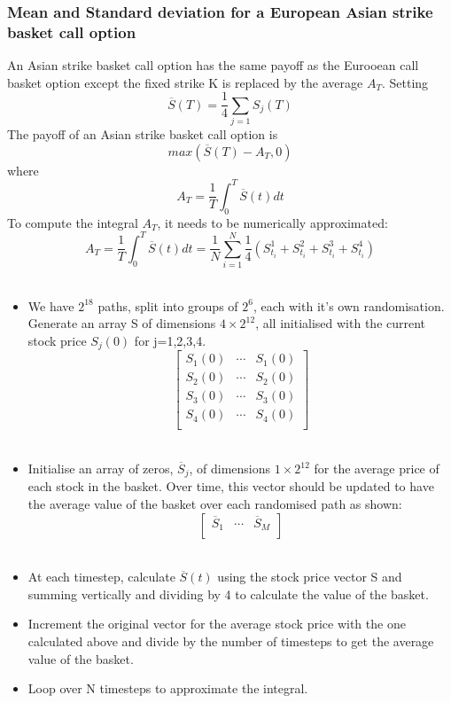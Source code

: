 \documentclass{article}
\begin{document}
\subsubsection* {Mean and Standard deviation for a European Asian strike basket call option}
An Asian strike basket call option has the same payoff as the Eurooean call basket option except the fixed strike K is replaced by the average $A_T$. 
Setting \[\overline{S}(T) = \frac{1}{4}\sum_{j=1} S_j(T)\]
The payoff of an Asian strike basket call option is  \[max(\overline{S}(T)  - A_T, 0)\]
where \[A_T = \frac{1}{T} \int_{0}^{T} \overline{S}(t) dt\]
To compute the integral $A_T$, it needs to be numerically approximated:
 \[A_T = \frac{1}{T} \int_{0}^{T} \overline{S}(t) dt = \frac{1}{N} \sum_{i=1}^{N}\frac{1}{4}(S_{t_i}^1 +S_{t_i}^2+ S_{t_i}^3+S_{t_i}^4)\]\
\begin{itemize}
\item We have $2^{18}$ paths, split into groups of $2^6$, each with it's own randomisation. Generate an array S of dimensions $4 \times 2^{12} $, all initialised with the current stock price $S_j(0)$ for j=1,2,3,4.
\[
\begin{bmatrix}
S_1(0) & \cdots & S_1(0)\\
S_2(0) & \cdots & S_2(0)\\
S_3(0) & \cdots & S_3(0)\\
S_4(0) & \cdots & S_4(0)\\
\end{bmatrix}
\]\
\item Initialise an array of zeros, $\overline{S}_j$, of dimensions $1 \times 2^{12}$ for the average price of each stock in the basket. Over time, this vector should be updated to have the average value of the basket over each randomised path as shown:
\[
\begin{bmatrix}
\overline{S}_1 & \cdots & \overline{S}_M\\
\end{bmatrix}
\]\
\item At each timestep, calculate $\overline{S}(t)$ using the stock price vector S and summing vertically and dividing by 4 to calculate the value of the basket. 
\item Increment the original vector for the average stock price with the one calculated above and divide by the number of timesteps to get the average value of the basket. 
\item Loop over N timesteps to approximate the integral. 
\end{itemize}
\end{document}
